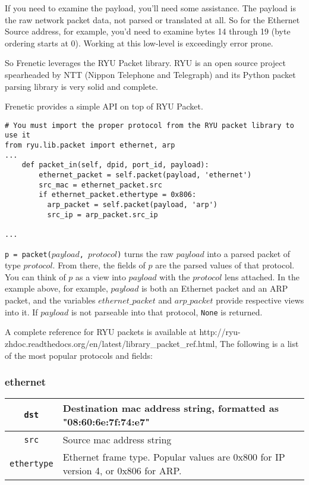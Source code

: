 If you need to examine the payload, you'll need some assistance.
The payload is the raw network packet data, not parsed or translated at all.
So for the Ethernet Source address, for example, you'd need to examine bytes 14 through 19 
(byte ordering starts at 0).  
Working at this low-level is exceedingly error prone.

So Frenetic leverages the RYU Packet library.
RYU is an open source project spearheaded by NTT (Nippon Telephone and Telegraph) and its Python packet
parsing library is very solid and complete.

Frenetic provides a simple API on top of RYU Packet.

\begin{lstlisting}
# You must import the proper protocol from the RYU packet library to use it
from ryu.lib.packet import ethernet, arp
...
    def packet_in(self, dpid, port_id, payload):
        ethernet_packet = self.packet(payload, 'ethernet')
        src_mac = ethernet_packet.src
        if ethernet_packet.ethertype = 0x806:
          arp_packet = self.packet(payload, 'arp')
          src_ip = arp_packet.src_ip

...
\end{lstlisting}

\texttt{p = packet($payload$, $protocol$)} turns the raw $payload$ into a parsed packet of type $protocol$.  
From there, the fields of $p$ are the parsed values of that protocol.  
You can think of $p$ as a view into $payload$ with the $protocol$ lens attached.  
In the example above, for example, $payload$ is both an Ethernet packet and an ARP packet, and the 
variables $ethernet\_packet$ and $arp\_packet$ provide respective views into it.   
If $payload$ is not parseable into that protocol, \texttt{None} is returned.  

A complete reference for RYU packets is available at 
http://ryu-zhdoc.readthedocs.org/en/latest/library\_packet\_ref.html, 
The following is a list of the most popular protocols and fields:

\subsubsection{ethernet}

\bigskip
\begin{tabularx}{6in}{|c|X|}
\hline\hline
\texttt{dst} & Destination mac address string, formatted as "08:60:6e:7f:74:e7" 
\\ \hline
\texttt{src} & Source mac address string 
\\ \hline
\texttt{ethertype} & Ethernet frame type.  
Popular values are 0x800 for IP version 4, or 0x806 for ARP.  
\\ \hline\hline
\end{tabularx}


